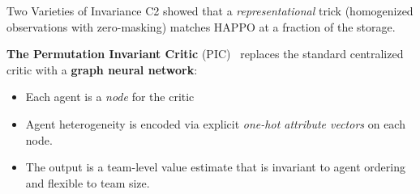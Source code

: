 %
%


\begin{frame}{Two Varieties of Invariance}
    C2 showed that a \emph{representational} trick (homogenized observations
    with zero-masking) matches HAPPO at a fraction of the storage.
    
    \vspace{0.4em}
    \textbf{The Permutation Invariant Critic}
    (PIC)~\cite{liu2020b} replaces the standard centralized critic
    with a \textbf{graph neural network}:
    \begin{itemize}
        \item Each agent is a \emph{node} for the critic
        \item Agent heterogeneity is encoded via explicit
        \emph{one-hot attribute vectors} on each node.
        \item The output is a team-level value estimate that is
        invariant to agent ordering and flexible to team size.
    \end{itemize}
\end{frame}



